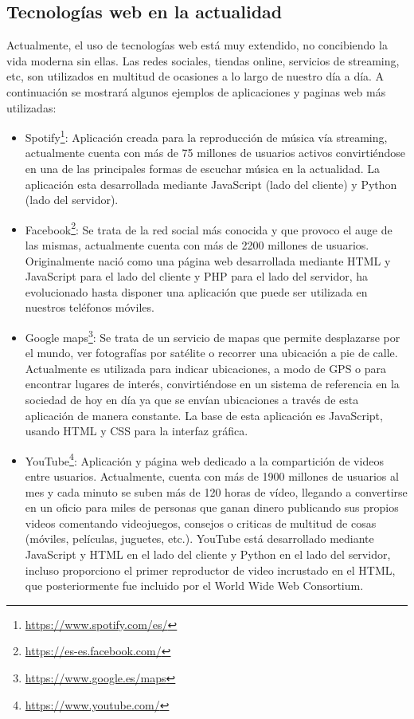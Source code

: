 \subsection{Tecnologías web en la actualidad}
Actualmente, el uso de tecnologías web está muy extendido, no concibiendo la vida moderna sin ellas. Las redes sociales, tiendas online, servicios de streaming, etc, son utilizados en multitud de ocasiones a lo largo de nuestro día a día. A continuación se mostrará algunos ejemplos de aplicaciones y paginas web más utilizadas:
\begin{itemize}
\item Spotify\footnote{\url{https://www.spotify.com/es/}}: Aplicación creada para la reproducción de música vía streaming, actualmente cuenta con más de 75 millones de usuarios activos convirtiéndose en una de las principales formas de escuchar música en la actualidad. La aplicación esta desarrollada mediante JavaScript (lado del cliente) y Python (lado del servidor).
\item Facebook\footnote{\url{https://es-es.facebook.com/}}: Se trata de la red social más conocida y que provoco el auge de las mismas, actualmente cuenta con más de 2200 millones de usuarios. Originalmente nació como una página web desarrollada mediante HTML y JavaScript para el lado del cliente y PHP para el lado del servidor, ha evolucionado hasta disponer una aplicación que puede ser utilizada en nuestros teléfonos móviles.
\item Google maps\footnote{\url{https://www.google.es/maps}}: Se trata de un servicio de mapas que permite desplazarse por el mundo, ver fotografías por satélite o recorrer una ubicación a pie de calle. Actualmente es utilizada para indicar ubicaciones, a modo de GPS o para encontrar lugares de interés, convirtiéndose en un sistema de referencia en la sociedad de hoy en día ya que se envían ubicaciones a través de esta aplicación de manera constante. La base de esta aplicación es JavaScript, usando HTML y CSS para la interfaz gráfica.
\item YouTube\footnote{\url{https://www.youtube.com/}}: Aplicación y página web dedicado a la compartición de videos entre usuarios. Actualmente, cuenta con más de 1900 millones de usuarios al mes y cada minuto se suben más de 120 horas de vídeo, llegando a convertirse en un oficio para miles de personas que ganan dinero publicando sus propios videos comentando videojuegos, consejos o criticas de multitud de cosas (móviles, películas, juguetes, etc.). YouTube está desarrollado mediante JavaScript y HTML en el lado del cliente y Python en el lado del servidor, incluso proporciono el primer reproductor de video incrustado en el HTML, que posteriormente fue incluido por el World Wide Web Consortium.

\end{itemize}
